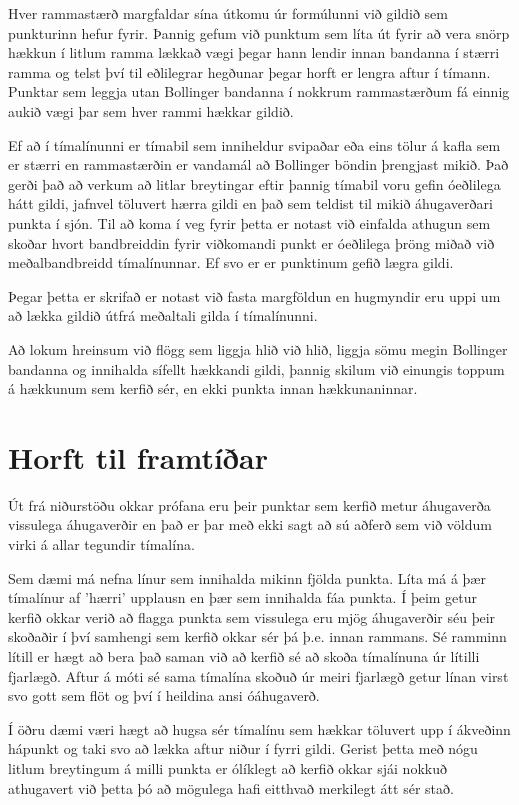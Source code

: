 \documentclass{article}
\begin{document}
{
  \color{red}
Hver rammastærð margfaldar sína útkomu úr formúlunni
við gildið sem punkturinn hefur fyrir.
}
Þannig gefum við punktum sem líta út fyrir að vera
snörp hækkun í litlum ramma lækkað vægi þegar hann
lendir innan bandanna í stærri ramma
og telst því til eðlilegrar hegðunar þegar horft er
lengra aftur í tímann.
Punktar sem leggja utan Bollinger bandanna í nokkrum
rammastærðum fá einnig aukið vægi þar sem hver rammi
hækkar gildið.

Ef að í tímalínunni er tímabil sem inniheldur svipaðar
eða eins tölur á kafla sem er stærri en rammastærðin er
vandamál að Bollinger 
böndin þrengjast mikið. Það gerði það að verkum að
litlar breytingar eftir þannig tímabil voru gefin
óeðlilega hátt gildi, 
jafnvel töluvert hærra gildi en það sem teldist til
mikið áhugaverðari punkta í sjón. Til að koma í veg
fyrir þetta er notast við
einfalda athugun sem skoðar hvort bandbreiddin fyrir
viðkomandi punkt er óeðlilega þröng miðað við
meðalbandbreidd tímalínunnar.
Ef svo er er punktinum gefið lægra gildi. 

{
  \color{red}
Þegar þetta er skrifað er notast við fasta margföldun en hugmyndir
eru uppi um að lækka 
gildið útfrá meðaltali gilda í tímalínunni.
}

Að lokum hreinsum við flögg sem liggja hlið við hlið,
liggja sömu megin Bollinger bandanna og innihalda
sífellt hækkandi gildi, 
þannig skilum við einungis toppum á hækkunum sem kerfið
sér, en ekki punkta innan hækkunaninnar.

\section{Horft til framtíðar}
Út frá niðurstöðu okkar prófana eru þeir punktar sem kerfið metur
áhugaverða vissulega áhugaverðir en það er þar með ekki sagt að
sú aðferð sem við völdum virki á allar tegundir tímalína. 

Sem dæmi má nefna línur sem innihalda mikinn fjölda punkta.
Líta má á þær tímalínur af 'hærri' upplausn en þær sem innihalda fáa punkta. Í
þeim getur kerfið okkar verið að flagga punkta sem vissulega eru mjög
áhugaverðir séu þeir skoðaðir í því samhengi sem kerfið okkar sér þá þ.e. innan
rammans. Sé ramminn lítill er hægt að bera það saman við að kerfið sé að skoða
tímalínuna úr lítilli fjarlægð. Aftur á móti sé sama tímalína skoðuð úr meiri
fjarlægð getur línan virst svo gott sem flöt og því í heildina ansi óáhugaverð.

Í öðru dæmi væri hægt að hugsa sér tímalínu sem hækkar töluvert upp í ákveðinn
hápunkt og taki svo að lækka aftur niður í fyrri gildi. Gerist þetta með nógu
litlum breytingum á milli punkta er ólíklegt að kerfið okkar sjái nokkuð
athugavert við þetta þó að mögulega hafi eitthvað merkilegt átt sér stað. 
\end{document}
